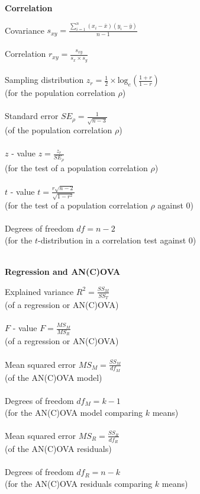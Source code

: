 \begin{minipage}[t]{.45\textwidth}
\begin{center}
    \textbf{Correlation}
\end{center}
\hline
\answerskip
Covariance \hfill $s_{xy} = \frac{\sum^n_{i = 1} (x_i - \bar{x})(y_i - \bar{y})}{n - 1}$\\
\\
Correlation \hfill $r_{xy} = \frac{s_{xy}}{s_x \times s_y}$ \\
\\
Sampling distribution \hfill $z_r = \frac{1}{2} \times \text{log}_e (\frac{1 + r}{1 - r})$\\
{\scriptsize (for the population correlation $\rho$)} \\
\\
Standard error \hfill $SE_{\rho} = \frac{1}{\sqrt{n - 3}}$\\
{\scriptsize (of the population correlation $\rho$)} \\
\\
$z$ - value \hfill $z = \frac{z_r}{SE_{\rho}}$\\
{\scriptsize (for the test of a population correlation $\rho$)} \\
\\
$t$ - value \hfill $t = \frac{r \sqrt{n - 2}}{\sqrt{1 - r^2}}$\\
{\scriptsize (for the test of a population correlation $\rho$ against 0)} \\
\\
Degrees of freedom \hfill $df = n - 2$\\
{\scriptsize (for the $t$-distribution in a correlation test against 0)} \\
\\
\begin{center}
    \textbf{Regression and AN(C)OVA}
\end{center}
\hline
\answerskip
Explained variance \hfill $R^2 = \frac{SS_M}{SS_T}$ \\
{\scriptsize (of a regression or AN(C)OVA)} \\
\\
$F$ - value \hfill $F = \frac{MS_M}{MS_R}$ \\
{\scriptsize (of a regression or AN(C)OVA)} \\
\\
Mean squared error \hfill $MS_M = \frac{SS_M}{df_M}$ \\
{\scriptsize (of the AN(C)OVA model)} \\
\\
Degrees of freedom \hfill $df_M = k - 1$ \\
{\scriptsize (for the AN(C)OVA model comparing $k$ means)} \\
\\
Mean squared error \hfill $MS_R = \frac{SS_R}{df_R}$ \\
{\scriptsize (of the AN(C)OVA residuals)} \\
\\
Degrees of freedom \hfill $df_R = n - k$ \\
{\scriptsize (for the AN(C)OVA residuals comparing $k$ means)} \\
\\
\end{minipage}
